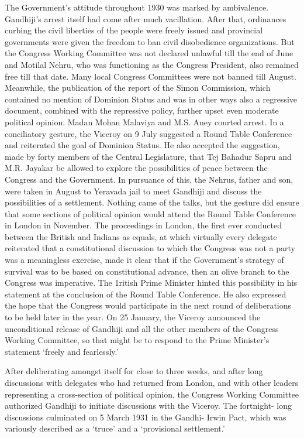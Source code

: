 The Government's attitude throughout 1930 was marked by ambivalence. Gandhiji's arrest itself had come after much vacillation. After that, ordinances curbing the civil liberties of the people were freely issued and provincial governments were given the freedom to ban civil disobedience organizations. But the Congress Working Committee was not declared unlawful till the end of June and Motilal Nehru, who was functioning as the Congress President, also remained free till that date. Many local Congress Committees were not banned till August. Meanwhile, the publication of the report of the Simon Commission, which contained no mention of Dominion Status and was in other ways also a regressive document, combined with the repressive policy, further upset even moderate political opinion. Madan Mohan Malaviya and M.S. Aney courted arrest. In a conciliatory gesture, the Viceroy on 9 July suggested a Round Table Conference and reiterated the goal of Dominion Status. He also accepted the suggestion, made by forty members of the Central Legislature, that Tej Bahadur Sapru and M.R. Jayakar be allowed to explore the possibilities of peace between the Congress and the Government. In pursuance of this, the Nehrus, father and son, were taken in August to Yeravada jail to meet Gandhiji and discuss the possibilities of a settlement. Nothing came of the talks, but the gesture did ensure that some sections of political opinion would attend the Round Table Conference in London in November. The proceedings in London, the first ever conducted between the British and Indians as equals, at which virtually every delegate reiterated that a constitutional discussion to which the Congress was not a party was a meaningless exercise, made it clear that if the Government's strategy of survival was to be based on constitutional advance, then an olive branch to the Congress was imperative. The 1ritish Prime Minister hinted this possibility in his statement at the conclusion of the Round Table Conference. He also expressed the hope that the Congress would participate in the next round of deliberations to be held later in the year. On 25 January, the Viceroy announced the unconditional release of Gandhiji and all the other members of the Congress Working Committee, so that might be to respond to the Prime Minister's statement `freely and fearlessly.'

After deliberating amongst itself for close to three weeks, and after long discussions with delegates who had returned from London, and with other leaders representing a cross-section of political opinion, the Congress Working Committee authorized Gandhiji to initiate discussions with the Viceroy. The fortnight- long discussions culminated on 5 March 1931 in the Gandhi- Irwin Pact, which was variously described as a `truce' and a `provisional settlement.'

